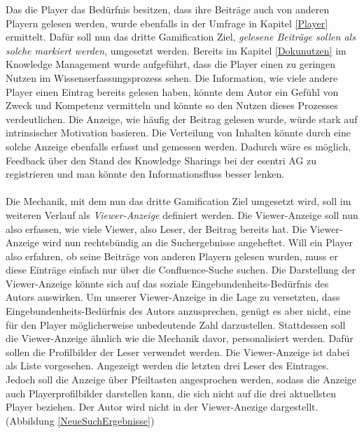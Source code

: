 \documentclass[a4paper,12pt,twoside]{scrartcl}
\begin{document}
Das die Player das Bedürfnis besitzen, dass ihre Beiträge auch von anderen Playern gelesen werden, wurde ebenfalls in der Umfrage in Kapitel \ref{Player} ermittelt. Dafür soll nun das dritte Gamification Ziel, \textit{gelesene Beiträge sollen als solche markiert werden}, umgesetzt werden. Bereits im Kapitel \ref{Dokunutzen} im Knowledge Management wurde aufgeführt, dass die Player einen zu geringen Nutzen im Wissenserfassungsprozess sehen.
Die Information, wie viele andere Player einen Eintrag bereits gelesen haben, könnte dem Autor ein Gefühl von Zweck und Kompetenz vermitteln und könnte so den Nutzen dieses Prozesses verdeutlichen. Die Anzeige, wie häufig der Beitrag gelesen wurde, würde stark auf intrinsischer Motivation basieren. Die Verteilung von Inhalten könnte durch eine solche Anzeige ebenfalls erfasst und gemessen werden. Dadurch wäre es möglich, Feedback über den Stand des Knowledge Sharings bei der esentri AG zu registrieren und man könnte den Informationsfluss besser lenken.
\\\\
Die Mechanik, mit dem nun das dritte Gamification Ziel umgesetzt wird, soll im weiteren Verlauf als \textit{Viewer-Anzeige} definiert werden. Die Viewer-Anzeige soll nun also erfassen, wie viele Viewer, also Leser, der Beitrag bereits hat. Die Viewer-Anzeige wird nun rechtsbündig an die Suchergebnisse angeheftet. Will ein Player also erfahren, ob seine Beiträge von anderen Playern gelesen wurden, muss er diese Einträge einfach nur über die Confluence-Suche suchen. Die Darstellung der Viewer-Anzeige könnte sich auf das soziale Eingebundenheits-Bedürfnis des Autors auswirken. Um unserer Viewer-Anzeige in die Lage zu versetzten, dass Eingebundenheits-Bedürfnis des Autors anzusprechen, genügt es aber nicht, eine für den Player möglicherweise unbedeutende Zahl darzustellen. Stattdessen soll die Viewer-Anzeige ähnlich wie die Mechanik davor, personalisiert werden. Dafür sollen die Profilbilder der Leser verwendet werden. Die Viewer-Anzeige ist dabei als Liste vorgesehen. Angezeigt werden die letzten drei Leser des Eintrages. Jedoch soll die Anzeige über Pfeiltasten angesprochen werden, sodass die Anzeige auch Playerprofilbilder darstellen kann, die sich nicht auf die drei aktuellsten Player beziehen. Der Autor wird nicht in der Viewer-Anezige dargestellt. (Abbildung \ref{NeueSuchErgebnisse})
\\\\
\end{document}
